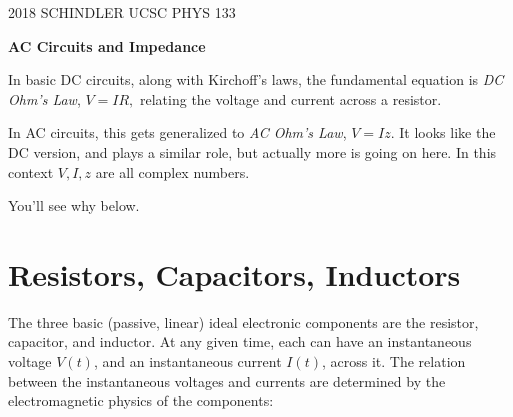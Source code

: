 \documentclass[11pt]{article}
\begin{document}
\begin{flushright}
2018 SCHINDLER UCSC PHYS 133\\
\end{flushright}

\begin{center}
\noindent  \textbf{ \LARGE AC Circuits and Impedance}
\end{center}

\noindent In basic DC circuits, along with Kirchoff's laws, the fundamental equation is \textit{DC Ohm's Law},  
$ V = IR,$ 
relating the voltage and current across a resistor. 

In AC circuits, this gets generalized to \textit{AC Ohm's Law},
$ V = Iz$. 
It looks like the DC version, and plays a similar role, but actually more is going on here. In this context $V,I,z$ are all complex numbers.

You'll see why below.

\section*{Resistors, Capacitors, Inductors}
The three basic (passive, linear) ideal electronic components are the resistor, capacitor, and inductor. At any given time, each can have an instantaneous voltage $V(t)$, and an instantaneous current $I(t)$, across it. The relation between the instantaneous voltages and currents are determined by the electromagnetic physics of the components:
\end{document}
